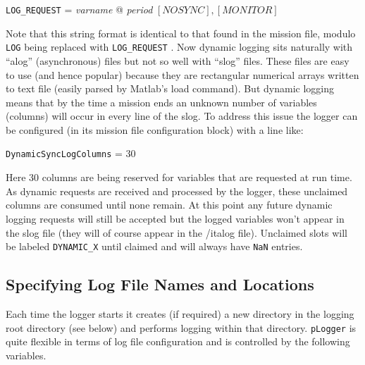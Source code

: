 \documentclass[a4paper,10pt]{article}
\newcommand{\Code}[1]{\texttt{#1} }
\newcommand{\code}[1]{\Code{#1} }
\begin{document}
\begin{center}
\code{LOG\_REQUEST} =  {\it{varname}} @ {\it{period}} $[NOSYNC],[MONITOR]$
\end{center}

Note that this string format is identical to that found in the mission file, modulo \code{LOG} being replaced with \code{LOG\_REQUEST}. Now dynamic logging sits naturally with ``alog'' (asynchronous) files but not so well with ``slog'' files. These files are easy to use (and hence popular)  because they are rectangular numerical arrays written to text file (easily parsed by Matlab's load command). But dynamic logging means that by the time a mission ends an unknown number of variables (columns) will occur in every line of the slog. To address this issue the logger can be configured (in its mission file configuration block) with a line like:

\begin{center}
\code{DynamicSyncLogColumns} =  30
\end{center}

Here 30 columns are being reserved for variables that are requested at run time. As dynamic requests are received and processed by the logger, these unclaimed columns are consumed until none remain. At this point any future dynamic logging requests will still be accepted but the logged variables won't appear in the slog file (they will of course appear in the {/it{alog}} file). Unclaimed slots will be labeled \code{DYNAMIC\_X} until claimed and will always have \code{NaN} entries.


\subsection{Specifying Log File Names and Locations}\label{Sec:Places}

Each time the logger starts it creates (if required) a new directory in the logging root directory (see below) and performs logging within that directory. \code{pLogger} is quite flexible in terms of log file configuration and is controlled by the following variables.
\end{document}
